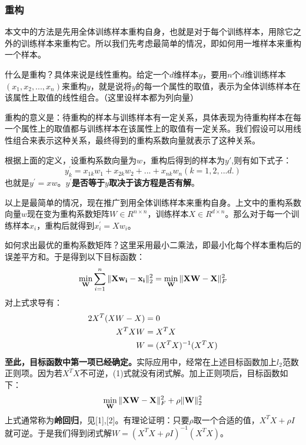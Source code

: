\documentclass{ctexart}
\begin{document}
	\subsubsection{重构}
	本文中的方法是先用全体训练样本重构自身，也就是对于每个训练样本，用除它之外的训练样本来重构它。所以我们先考虑最简单的情况，即如何用一堆样本来重构一个样本。
	
	什么是重构？具体来说是线性重构。给定一个$ d $维样本$ y $，要用$ n $个$ d $维训练样本$ (x_1,x_2,...,x_n) $来重构$ y $，就是说将$ y $的每一个属性的取值，表示为全体训练样本在该属性上取值的线性组合。（这里设样本都为列向量）
	
	重构的意义是：待重构的样本与训练样本有一定关系，具体表现为待重构样本在每一个属性上的取值都与训练样本在该属性上的取值有一定关系。我们假设可以用线性组合来表示这种关系，最终得到的重构系数向量就表示了这种关系。
	
	根据上面的定义，设重构系数向量为$ w $，重构后得到的样本为$ y' $,则有如下式子：
	\begin{equation}
		y_{k}^{'} = x_{1k}w_1 + x_{2k}w_2 + ... + x_{nk}w_n(k=1,2,...d.)
	\end{equation}
	也就是$ y^{'}=xw $。{\bfseries $ y^{'} $是否等于$ y $取决于该方程是否有解}。
	
	以上是最简单的情况，现在推广到用全体训练样本来重构自身。上文中的重构系数向量$ w $现在变为重构系数矩阵$ W \in R^{n \times n} $，训练样本$ X \in R^{d \times n} $。那么对于每一个训练样本$ x_i $，重构后就得到$ x_{i}^{'} =  Xw_i $。
	
	如何求出最优的重构系数矩阵？这里采用最小二乘法，即最小化每个样本重构后的误差平方和。于是得到以下目标函数：
	\begin{equation}
	\min_\mathbf{W} \sum_{i=1}^{n} \Arrowvert{\mathbf{Xw_i} - \mathbf{x_i}} \Arrowvert_{2}^{2} = \min_\mathbf{W} \Arrowvert{\mathbf{XW-X}}\Arrowvert_F^2
	\end{equation}
	对上式求导有：
	\begin{equation}
		\begin{split}
		2X^{T}(XW-X) &= 0 \notag \\
		X^{T}XW &= X^{T}X \notag \\
		W &= (X^{T}X)^{-1}(X^{T}X) \notag
		\end{split}
	\end{equation}
	{\bfseries 至此，目标函数中第一项已经确定。}实际应用中，经常在上述目标函数加上$ l_2 $范数正则项。因为若$ X^{T}X $不可逆，(1)式就没有闭式解。加上正则项后，目标函数如下：
	\begin{equation}
	\min_\mathbf{W} \Arrowvert{\mathbf{XW-X}}\Arrowvert_{F}^{2} + \rho \Arrowvert{\mathbf W}\Arrowvert_2^2
	\end{equation}
	上式通常称为{\bfseries 岭回归}，见[1],[2]。有理论证明：只要$ \rho $取一个合适的值，$ X^{T}X + \rho I $就可逆。于是我们得到闭式解$ W = (X^{T}X + \rho I)^{-1}(X^{T}X) $。
	
\end{document}

